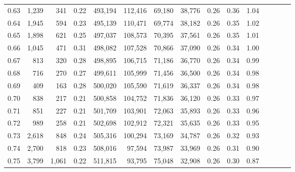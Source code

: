 \begin{tabular}{rrrcrrrrrrrrrrr}
0.63 &   1,239 &    341 &                                       0.22 &  493,194 &  112,416 &   69,180 &   38,776 &  0.26 &  0.36 &                         1.04 \\
0.64 &   1,945 &    594 &                                       0.23 &  495,139 &  110,471 &   69,774 &   38,182 &  0.26 &  0.35 &                         1.02 \\
0.65 &   1,898 &    621 &                                       0.25 &  497,037 &  108,573 &   70,395 &   37,561 &  0.26 &  0.35 &                         1.01 \\
0.66 &   1,045 &    471 &                                       0.31 &  498,082 &  107,528 &   70,866 &   37,090 &  0.26 &  0.34 &                         1.00 \\
0.67 &     813 &    320 &                                       0.28 &  498,895 &  106,715 &   71,186 &   36,770 &  0.26 &  0.34 &                         0.99 \\
0.68 &     716 &    270 &                                       0.27 &  499,611 &  105,999 &   71,456 &   36,500 &  0.26 &  0.34 &                         0.98 \\
0.69 &     409 &    163 &                                       0.28 &  500,020 &  105,590 &   71,619 &   36,337 &  0.26 &  0.34 &                         0.98 \\
0.70 &     838 &    217 &                                       0.21 &  500,858 &  104,752 &   71,836 &   36,120 &  0.26 &  0.33 &                         0.97 \\
0.71 &     851 &    227 &                                       0.21 &  501,709 &  103,901 &   72,063 &   35,893 &  0.26 &  0.33 &                         0.96 \\
0.72 &     989 &    258 &                                       0.21 &  502,698 &  102,912 &   72,321 &   35,635 &  0.26 &  0.33 &                         0.95 \\
0.73 &   2,618 &    848 &                                       0.24 &  505,316 &  100,294 &   73,169 &   34,787 &  0.26 &  0.32 &                         0.93 \\
0.74 &   2,700 &    818 &                                       0.23 &  508,016 &   97,594 &   73,987 &   33,969 &  0.26 &  0.31 &                         0.90 \\
0.75 &   3,799 &  1,061 &                                       0.22 &  511,815 &   93,795 &   75,048 &   32,908 &  0.26 &  0.30 &                         0.87 \\

\end{tabular}
